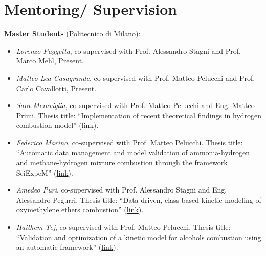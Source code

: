 \section{\sc Mentoring/ Supervision}

\textbf{Master Students} (Politecnico di Milano):

\begin{itemize}
   \item [ ] \textit{Lorenzo Paggetta}, co-supervised with Prof. Alessandro Stagni and
   Prof. Marco Mehl, Present. \item [ ] \textit{Matteo Lea Casagrande}, co-supervised with
      Prof. Matteo Pelucchi and Prof. Carlo Cavallotti, Present.

   \item [ ] \textit{Sara Meraviglia}, co supervised with Prof. Matteo Pelucchi and Eng.
      Matteo Primi. Thesis title: ``Implementation of recent theoretical findings in
      hydrogen combustion model'' (\href{https://hdl.handle.net/10589/214934}{link}).

   \item [ ] \textit{Federico Marino}, co-supervised with Prof. Matteo Pelucchi. Thesis
      title: ``Automatic data management and model validation of ammonia-hydrogen and
      methane-hydrogen mixture combustion through the framework SciExpeM''
      (\href{https://hdl.handle.net/10589/212616}{link}).

   \item [ ] \textit{Amedeo Puri}, co-supervised with Prof. Alessandro Stagni and Eng.
      Alessandro Pegurri. Thesis title: ``Data-driven, class-based kinetic modeling of
      oxymethylene ethers combustion'' (\href{https://hdl.handle.net/10589/206686}{link}).

   \item [ ] \textit{Haithem Tej}, co-supervised with Prof. Matteo Pelucchi. Thesis title:
      ``Validation and optimization of a kinetic model for alcohols combustion using an
      automatic framework'' (\href{https://hdl.handle.net/10589/210401}{link}).

\end{itemize}
